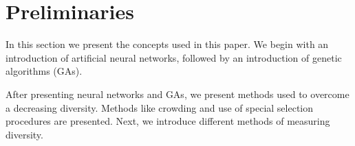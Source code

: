 \section{Preliminaries}
\label{sec:preliminaries}

In this section we present the concepts used in this paper.
We begin with an introduction of artificial neural networks, followed by an introduction of genetic algorithms (GAs). 

After presenting neural networks and GAs, we present methods used to overcome a decreasing diversity. Methods like crowding and use of special selection procedures are presented. Next, we introduce different methods of measuring diversity.







